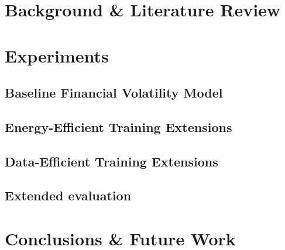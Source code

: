 \documentclass[a4paper, 12pt]{report}
\begin{document}
    \newpage
    \chapter{Background \& Literature Review}
    \label{chapter: literature}


    \newpage
    \chapter{Experiments}
    \label{chapter: experiments}

    \section{Baseline Financial Volatility Model}
    \label{section: baseline}

    \section{Energy-Efficient Training Extensions}
    \label{section: energy-extensions}

    \section{Data-Efficient Training Extensions}
    \label{section: data-extensions}

    \section{Extended evaluation}
    \label{section: evaluation}


    \newpage
    \chapter{Conclusions \& Future Work}
    \label{chapter: conclusion}


    \newpage
    
\end{document}
